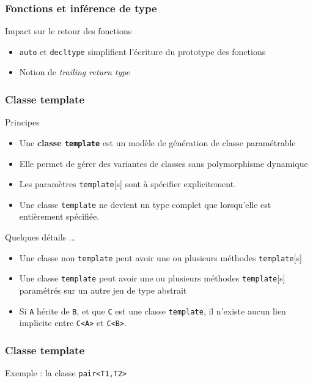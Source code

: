 \documentclass[svgnames]{beamer}
\begin{document}
\frame
{
  \frametitle{Fonctions et inférence de type}
  \begin{block}{Impact sur le retour des fonctions}
  \begin{itemize}
  \item \texttt{auto} et \texttt{decltype} simplifient l'\'ecriture
  du prototype des fonctions
  \item Notion de \textit{trailing return type}
  \end{itemize}

  
  \end{block}{}
}
\frame
{
  \frametitle{Classe template}
  \begin{block}{Principes}
  \begin{itemize}
  \footnotesize
  \item Une \textbf{classe \texttt{template}} est un modèle de génération de classe paramétrable
  \item Elle permet de gérer des variantes de classes sans polymorphisme dynamique
  \item Les paramètres \texttt{template}[s] sont à spécifier explicitement.
  \item Une classe \texttt{template} ne devient un type complet que lorsqu'elle est entièrement spécifiée.
  \end{itemize}
  \end{block}

  \begin{block}{Quelques détails ...}
  \begin{itemize}
  \footnotesize
  \item Une classe non \texttt{template} peut avoir une ou plusieurs méthodes \texttt{template}[s]
  \item Une classe \texttt{template} peut avoir une ou plusieurs méthodes \texttt{template}[s] paramétrés sur un autre jeu de type abstrait
  \item Si \texttt{A} hérite de \texttt{B}, et que \texttt{C} est une classe \texttt{template}, il n'existe aucun lien implicite
  entre \texttt{C<A>} et \texttt{C<B>}.
  \end{itemize}
  \end{block}
}

\frame
{
  \frametitle{Classe template}
  \begin{block}{Exemple : la classe \texttt{pair<T1,T2>}}

  \lsttmppair

  \end{block}
}
\end{document}
